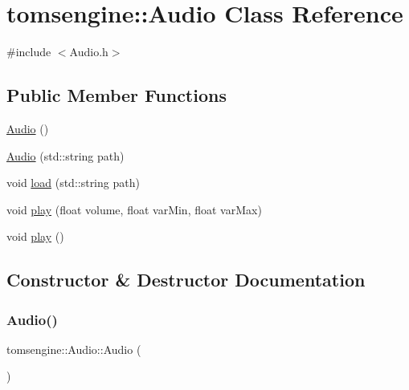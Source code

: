 \hypertarget{classtomsengine_1_1_audio}{}\section{tomsengine\+:\+:Audio Class Reference}
\label{classtomsengine_1_1_audio}


{\ttfamily \#include $<$Audio.\+h$>$}

\subsection*{Public Member Functions}
\begin{DoxyCompactItemize}
\item 
\mbox{\hyperlink{classtomsengine_1_1_audio_aee99a1f1f3bd83e11bba42266066e8f1}{Audio}} ()
\item 
\mbox{\hyperlink{classtomsengine_1_1_audio_ab653e551f2f665a7bd15b430166d6d36}{Audio}} (std\+::string path)
\item 
void \mbox{\hyperlink{classtomsengine_1_1_audio_ad8d728ef8d09ace872af3d7a441eb8f1}{load}} (std\+::string path)
\item 
void \mbox{\hyperlink{classtomsengine_1_1_audio_a7ee76d0a8c6e9031f426eb61a157fccc}{play}} (float volume, float var\+Min, float var\+Max)
\item 
void \mbox{\hyperlink{classtomsengine_1_1_audio_af1d795d8302a2c23ee1307492f4ec705}{play}} ()
\end{DoxyCompactItemize}


\subsection{Constructor \& Destructor Documentation}
\mbox{\label{classtomsengine_1_1_audio_aee99a1f1f3bd83e11bba42266066e8f1}} 
\subsubsection{\texorpdfstring{Audio()}{Audio()}\hspace{0.1cm}{\footnotesize\ttfamily [1/2]}}
{\footnotesize\ttfamily tomsengine\+::\+Audio\+::\+Audio (\begin{DoxyParamCaption}{ }\end{DoxyParamCaption})}

